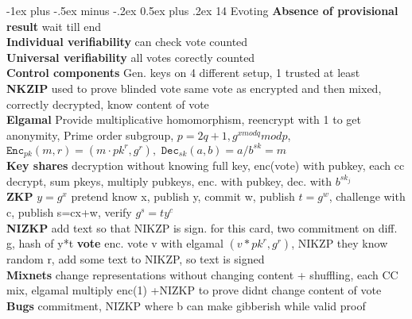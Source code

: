 \documentclass[10pt,landscape]{article}
\makeatletter
\renewcommand{\section}{\@startsection{section}{1}{0mm}%
                                {-1ex plus -.5ex minus -.2ex}%
                                {0.5ex plus .2ex}%
                                {\normalfont\large\bfseries}}
\makeatother
\begin{document}
\begin{multicols*}{4}
\section{14 Evoting}
\textbf{Absence of provisional result} wait till end\\
\textbf{Individual verifiability} can check vote counted\\
\textbf{Universal verifiability} all votes corectly counted\\
\textbf{Control components} Gen. keys on 4 different setup, 1 trusted at least\\
\textbf{NKZIP} used to prove blinded vote same vote as encrypted and then mixed, correctly decrypted, know content of vote\\
\textbf{Elgamal} Provide multiplicative homomorphism, reencrypt with 1 to get anonymity, Prime order subgroup, $p=2q+1, g^{x mod q}mod p$, $\texttt{Enc}_{pk}(m,r)=(m\cdot pk^r, g^r), \texttt{ Dec}_{sk}(a,b)=a/b^{sk}=m$\\
\textbf{Key shares} decryption without knowing full key, enc(vote) with pubkey, each cc decrypt, sum pkeys, multiply pubkeys, enc. with pubkey, dec. with $b^{sk_j}$\\
\textbf{ZKP} $y=g^x$ pretend know x, publish y, commit w, publish $t=g^w$, challenge with c, publish s=cx+w, verify $g^s=ty^c$\\
\textbf{NIZKP} add text so that NIKZP is sign. for this card, two commitment on diff. g, hash of y*t
\textbf{vote} enc. vote v with elgamal $(v*pk^r, g^r)$, NIKZP they know random r, add some text to NIKZP, so text is signed\\
\textbf{Mixnets} change representations without changing content + shuffling, each CC mix, elgamal multiply enc(1) +NIZKP to prove didnt change content of vote\\
\textbf{Bugs} commitment, NIZKP where b can make gibberish while valid proof
\end{multicols*}
\end{document}
